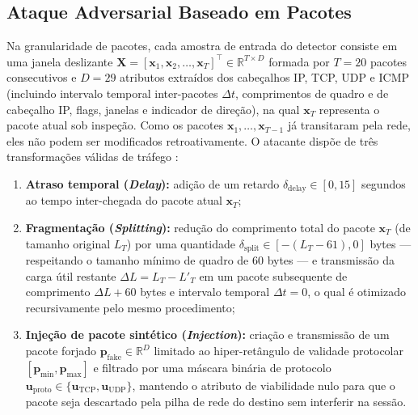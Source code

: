 \documentclass[conference]{IEEEtran}
\begin{document}
\subsection{Ataque Adversarial Baseado em Pacotes}

Na granularidade de pacotes, cada amostra de entrada do detector consiste em uma janela deslizante $\mathbf{X} = [\mathbf{x}_1, \mathbf{x}_2, \dots, \mathbf{x}_T]^{\top} \in \mathbb{R}^{T \times D}$ formada por $T = 20$ pacotes consecutivos e $D = 29$ atributos extraídos dos cabeçalhos IP, TCP, UDP e ICMP (incluindo intervalo temporal inter-pacotes $\Delta t$, comprimentos de quadro e de cabeçalho IP, flags, janelas e indicador de direção), na qual $\mathbf{x}_T$ representa o pacote atual sob inspeção.
Como os pacotes $\mathbf{x}_1, \dots, \mathbf{x}_{T-1}$ já transitaram pela rede, eles não podem ser modificados retroativamente.
O atacante dispõe de três transformações válidas de tráfego \cite{hashemi2019}:
\begin{enumerate}
    \item \textbf{Atraso temporal (\textit{Delay}):} adição de um retardo $\delta_{\text{delay}} \in [0, 15]$ segundos ao tempo inter-chegada do pacote atual $\mathbf{x}_T$;
    \item \textbf{Fragmentação (\textit{Splitting}):} redução do comprimento total do pacote $\mathbf{x}_T$ (de tamanho original $L_T$) por uma quantidade $\delta_{\text{split}} \in [-(L_T - 61), 0]$ bytes — respeitando o tamanho mínimo de quadro de $60$ bytes — e transmissão da carga útil restante $\Delta L = L_T - L'_T$ em um pacote subsequente de comprimento $\Delta L + 60$ bytes e intervalo temporal $\Delta t = 0$, o qual é otimizado recursivamente pelo mesmo procedimento;
    \item \textbf{Injeção de pacote sintético (\textit{Injection}):} criação e transmissão de um pacote forjado $\mathbf{p}_{\text{fake}} \in \mathbb{R}^{D}$ limitado ao hiper-retângulo de validade protocolar $[\mathbf{p}_{\min}, \mathbf{p}_{\max}]$ e filtrado por uma máscara binária de protocolo $\mathbf{u}_{\text{proto}} \in \{\mathbf{u}_{\text{TCP}}, \mathbf{u}_{\text{UDP}}\}$, mantendo o atributo de viabilidade nulo para que o pacote seja descartado pela pilha de rede do destino sem interferir na sessão.
\end{enumerate}
\end{document}
